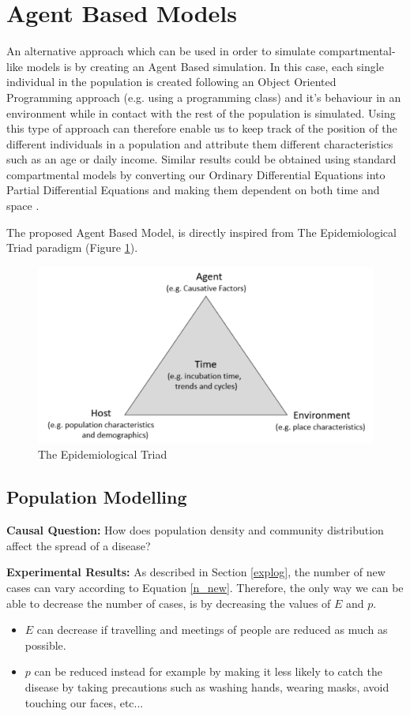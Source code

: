 \section{Agent Based Models}
\label{agent_smith}
An alternative approach which can be used in order to simulate compartmental-like models is by creating an Agent Based simulation. In this case, each single individual in the population is created following an Object Oriented Programming approach (e.g. using a programming class) and it's behaviour in an environment while in contact with the rest of the population is simulated. Using this type of approach can therefore enable us to keep track of the position of the different individuals in a population and attribute them different characteristics such as an age or daily income. Similar results could be obtained using standard compartmental models by converting our Ordinary Differential Equations into Partial Differential Equations and making them dependent on both time and space \cite{pde}.

The proposed Agent Based Model, is directly inspired from The Epidemiological Triad paradigm (Figure \ref{triad}).

\begin{figure}[h]
\vspace{-0.2cm}
\centering
\includegraphics[scale = 0.5]{latex/images/model.pdf}
\caption{The Epidemiological Triad}
\label{triad}
\end{figure}

\subsection{Population Modelling}

\textbf{Causal Question:} How does population density and community distribution affect the spread of a disease?

\textbf{Experimental Results:} As described in Section \ref{explog}, the number of new cases can vary according to Equation \ref{n_new}. Therefore, the only way we can be able to decrease the number of cases, is by decreasing the values of $E$ and $p$. 
\begin{itemize}
    \setlength\itemsep{-0.3cm}
    \item $E$ can decrease if travelling and meetings of people are reduced as much as possible.
    \item $p$ can be reduced instead for example by making it less likely to catch the disease by taking precautions such as washing hands, wearing masks, avoid touching our faces, etc...
\end{itemize}

